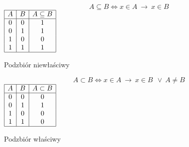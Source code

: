 \documentclass{SGGW-thesis}
\begin{document}
\begin{table}[h]
 \parbox{.45\linewidth}{
 \centering
 \begin{equation}
    A \subseteq B \iff x \in A \:\rightarrow\: x \in B
\end{equation}
        $\begin{array}{|c|c|c|}
            \hline
            A & B & A\subseteq B \\
            \hline
            0 & 0 & 1 \\
            0 & 1 & 1 \\
            1 & 0 & 0 \\
            1 & 1 & 1 \\
            \hline
            
        \end{array}$
    \caption{Podzbiór niewłaściwy}
}
\hspace{1.2cm}
 \parbox{.45\linewidth}{
 \centering
\begin{equation}
    A \subset B \iff x \in A \:\rightarrow\: x \in B\ \:\vee\: A \neq B
\end{equation}
        $\begin{array}{|c|c|c|}
            \hline
            A & B & A\subset B \\
            \hline
            0 & 0 & 0 \\
            0 & 1 & 1 \\
            1 & 0 & 0 \\
            1 & 1 & 0 \\
            \hline
        \end{array}$
    \caption{Podzbiór właściwy}
}
\end{table}

\newpage
\end{document}
